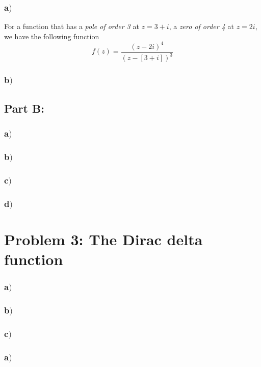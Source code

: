 \documentclass{article}
\begin{document}
\subsubsection*{a$)$}

For a function that has a \textit{pole of order 3} at $z = 3 + i$, a \textit{zero of order 4} at $z = 2i$, we have the following function 
\begin{equation}
f(z) = \frac{(z-2i)^4}{(z-[3+i])^3}
\end{equation}

\subsubsection*{b$)$}

\subsection*{Part B:}

\subsubsection*{a$)$}

\subsubsection*{b$)$}

\subsubsection*{c$)$}

\subsubsection*{d$)$}

\section*{Problem 3: The Dirac delta function}

\subsubsection*{a$)$}

\subsubsection*{b$)$}

\subsubsection*{c$)$}

\subsubsection*{a$)$}
\end{document}
